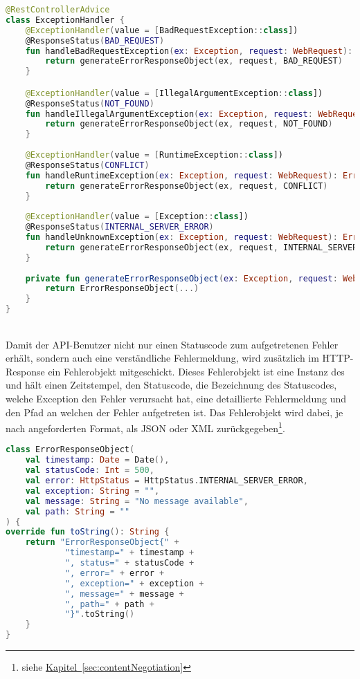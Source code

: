 \begin{lstlisting}[style=lstStyleFramed, language=Kotlin, caption={Spring-Konfiguration des Exceptionhandling}, label=lst:springExceptionHandling, float]
@RestControllerAdvice
class ExceptionHandler {
	@ExceptionHandler(value = [BadRequestException::class])
	@ResponseStatus(BAD_REQUEST)
	fun handleBadRequestException(ex: Exception, request: WebRequest): ErrorResponseObject {
		return generateErrorResponseObject(ex, request, BAD_REQUEST)
	}

	@ExceptionHandler(value = [IllegalArgumentException::class])
	@ResponseStatus(NOT_FOUND)
	fun handleIllegalArgumentException(ex: Exception, request: WebRequest): ErrorResponseObject {
		return generateErrorResponseObject(ex, request, NOT_FOUND)
	}
	
	@ExceptionHandler(value = [RuntimeException::class])
	@ResponseStatus(CONFLICT)
	fun handleRuntimeException(ex: Exception, request: WebRequest): ErrorResponseObject {
		return generateErrorResponseObject(ex, request, CONFLICT)
	}
	
	@ExceptionHandler(value = [Exception::class])
	@ResponseStatus(INTERNAL_SERVER_ERROR)
	fun handleUnknownException(ex: Exception, request: WebRequest): ErrorResponseObject {
		return generateErrorResponseObject(ex, request, INTERNAL_SERVER_ERROR)
	}
	
	private fun generateErrorResponseObject(ex: Exception, request: WebRequest, statusCode: HttpStatus): ErrorResponseObject {
		return ErrorResponseObject(...)
	}
}
\end{lstlisting}
\\
Damit der \gls{API}-Benutzer nicht nur einen Statuscode zum aufgetretenen Fehler erhält, sondern auch eine verständliche Fehlermeldung, wird zusätzlich im \gls{HTTP}-Response ein Fehlerobjekt mitgeschickt. Dieses Fehlerobjekt ist eine Instanz des  und hält einen Zeitstempel, den Statuscode, die Bezeichnung des Statuscodes, welche Exception den Fehler verursacht hat, eine detaillierte Fehlermeldung und den Pfad an welchen der Fehler aufgetreten ist. Das Fehlerobjekt wird dabei, je nach angeforderten Format, als \gls{JSON} oder \gls{XML} zurückgegeben\footnote{siehe \hyperref[sec:contentNegotiation]{Kapitel~\ref{sec:contentNegotiation}}}.
\\
\begin{lstlisting}[style=lstStyleFramed, language=Kotlin, caption={Spring-Konfiguration des Exceptionhandling}, label=lst:errorResponseObject, float]
class ErrorResponseObject(
	val timestamp: Date = Date(),
	val statusCode: Int = 500,
	val error: HttpStatus = HttpStatus.INTERNAL_SERVER_ERROR,
	val exception: String = "",
	val message: String = "No message available",
	val path: String = ""
) {
override fun toString(): String {
	return "ErrorResponseObject{" +
			"timestamp=" + timestamp +
			", status=" + statusCode +
			", error=" + error +
			", exception=" + exception +
			", message=" + message +
			", path=" + path +
			"}".toString()
	}
}
\end{lstlisting}

